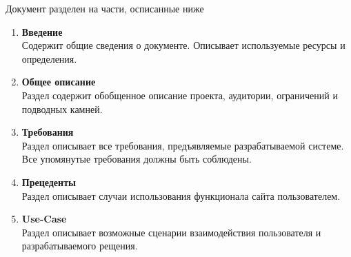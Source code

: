 
Документ разделен на части, осписанные ниже
\begin{enumerate}
      \item \textbf{Введение} \\
            Содержит общие сведения о документе. Описывает
            используемые ресурсы и определения.

      \item \textbf{Общее описание} \\
            Раздел содержит обобщенное описание проекта,
            аудитории, ограничений и подводных камней.

      \item \textbf{Требования} \\
            Раздел описывает все требования, предъявляемые
            разрабатываемой системе. Все упомянутые требования
            должны быть соблюдены.

      \item \textbf{Прецеденты} \\
            Раздел описывает случаи использования функционала сайта пользователем.

      \item \textbf{Use-Case} \\
            Раздел описывает возможные сценарии взаимодействия
            пользователя и разрабатываемого рещения.
      
\end{enumerate}
